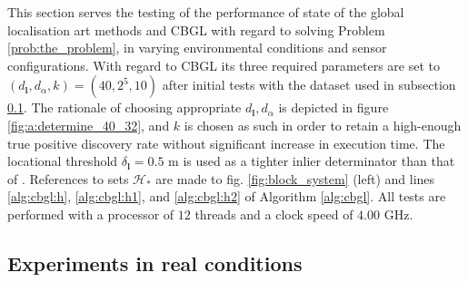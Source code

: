 This section serves the testing of the performance of state of the global
localisation art methods and CBGL with regard to solving Problem
\ref{prob:the_problem}, in varying environmental conditions and sensor
configurations. With regard to CBGL its three required parameters are set to
$(d_{\bm{l}},d_{\alpha},k) = (40, 2^5, 10)$ after initial tests with the
dataset used in subsection \ref{subsec:exp_a}.  The rationale of choosing
appropriate $d_{\bm{l}},d_{\alpha}$ is depicted in figure
\ref{fig:a:determine_40_32}, and $k$ is chosen as such in order to retain a
high-enough true positive discovery rate without significant increase in
execution time. The locational threshold $\delta_{\bm{l}} = 0.5$ m is used as
a tighter inlier determinator than that of \cite{Filotheou2022g}.
References to sets $\mathcal{H}_{\ast}$ are made to fig. \ref{fig:block_system}
(left) and lines \ref{alg:cbgl:h}, \ref{alg:cbgl:h1}, and \ref{alg:cbgl:h2} of
Algorithm \ref{alg:cbgl}. All tests are performed with a processor of $12$
threads and a clock speed of $4.00$ GHz.


\subsection{Experiments in real conditions}
\label{subsec:exp_a}

